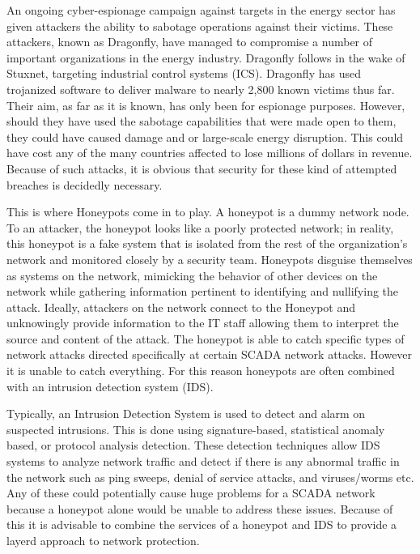 An ongoing cyber-espionage campaign against targets in the energy sector has given attackers the ability to sabotage operations against their victims. These attackers, known as Dragonfly, have managed to compromise a number of important organizations in the energy industry. Dragonfly follows in the wake of Stuxnet, targeting industrial control systems (ICS). Dragonfly has used trojanized software to deliver malware to nearly 2,800 known victims thus far. Their aim, as far as it is known, has only been for espionage purposes. However, should they have used the sabotage capabilities that were made open to them, they could have caused damage and or large-scale energy disruption. This could have cost any of the many countries affected to lose millions of dollars in revenue. Because of such attacks, it is obvious that security for these kind of attempted breaches is decidedly necessary. 

This is where Honeypots come in to play. A honeypot is a dummy network node. To an attacker, the honeypot looks like a poorly protected network; in reality, this honeypot is a fake system that is isolated from the rest of the organization’s network and monitored closely by a security team. Honeypots disguise themselves as systems on the network, mimicking the behavior of other devices on the network while gathering information pertinent to identifying and nullifying the attack. Ideally, attackers on the network connect to the Honeypot and unknowingly provide information to the IT staff allowing them to interpret the source and content of the attack. The honeypot is able to catch specific types of network attacks directed specifically at certain SCADA network attacks.  However it is unable to catch everything. For this reason honeypots are often combined with an intrusion detection system (IDS).

Typically, an Intrusion Detection System is used to detect and alarm on suspected intrusions. This is done using signature-based, statistical anomaly based, or protocol analysis detection. These detection techniques allow IDS systems to analyze network traffic and detect if there is any abnormal traffic in the network such as ping sweeps, denial of service attacks, and viruses/worms etc. Any of these could potentially cause huge problems for a SCADA network because a honeypot alone would be unable to address these issues. Because of this it is advisable to combine the services of a honeypot and IDS to provide a layerd approach to network protection.

